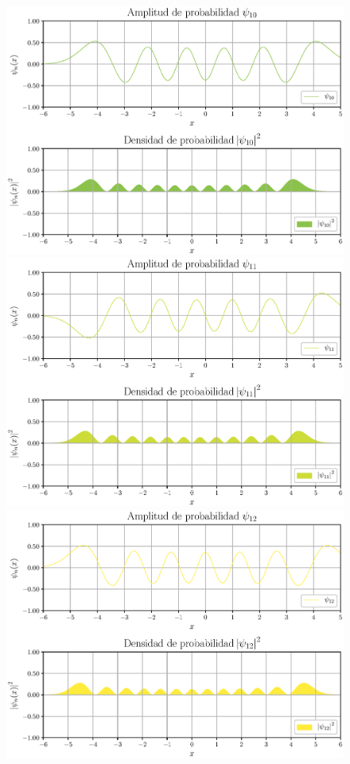 \newpage
\begin{figure}[hbt!]
    \centering
    \includegraphics[scale=0.6]{Imagenes/Funcion_Onda_010.eps}
    \includegraphics[scale=0.6]{Imagenes/Funcion_Onda_011.eps}
    \includegraphics[scale=0.6]{Imagenes/Funcion_Onda_012.eps}
\end{figure}

